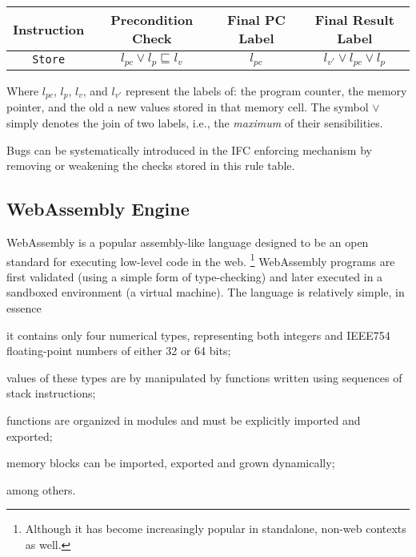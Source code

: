 \documentclass[sigconf, anonymous, review]{acmart}
\begin{document}
\begin{center}
\scriptsize
\begin{tabular}{|c|c|c|c|}
\hline
\textbf{Instruction}
& \textbf{Precondition Check}
& \textbf{Final PC Label}
& \textbf{Final Result Label} \\
\hline
\texttt{Store}
& $l_{pc} \vee l_{p} \sqsubseteq l_{v}$
& $l_{pc}$
& $l_{v'} \vee l_{pc} \vee l_{p}$ \\
\hline
\end{tabular}
\end{center}

\noindent Where $l_{pc}$, $l_{p}$, $l_{v}$, and $l_{v'}$ represent the labels
of: the program counter, the memory pointer, and the old a new values stored in
that memory cell.
%
The symbol $\vee$ simply denotes the join of two labels, i.e., the
\emph{maximum} of their sensibilities.


Bugs can be systematically introduced in the IFC enforcing mechanism by removing
or weakening the checks stored in this rule table.

\subsection{WebAssembly Engine}

WebAssembly \cite{haas2017bringing} is a popular assembly-like language designed
to be an open standard for executing low-level code in the web.%
%
\footnote{Although it has become increasingly popular in standalone, non-web
  contexts as well.}
%
WebAssembly programs are first validated (using a simple form of type-checking)
and later executed in a sandboxed environment (a virtual machine).
%
%
The language is relatively simple, in essence
%
\begin{inparaenum}
  \item it contains only four numerical types, representing both integers and
    IEEE754 floating-point numbers of either 32 or 64 bits;
  \item values of these types are by manipulated by functions written using
    sequences of stack instructions;
  \item functions are organized in modules and must be explicitly imported and
    exported;
  \item memory blocks can be imported, exported and grown dynamically;
\end{inparaenum}
%
among others.
%
\end{document}
